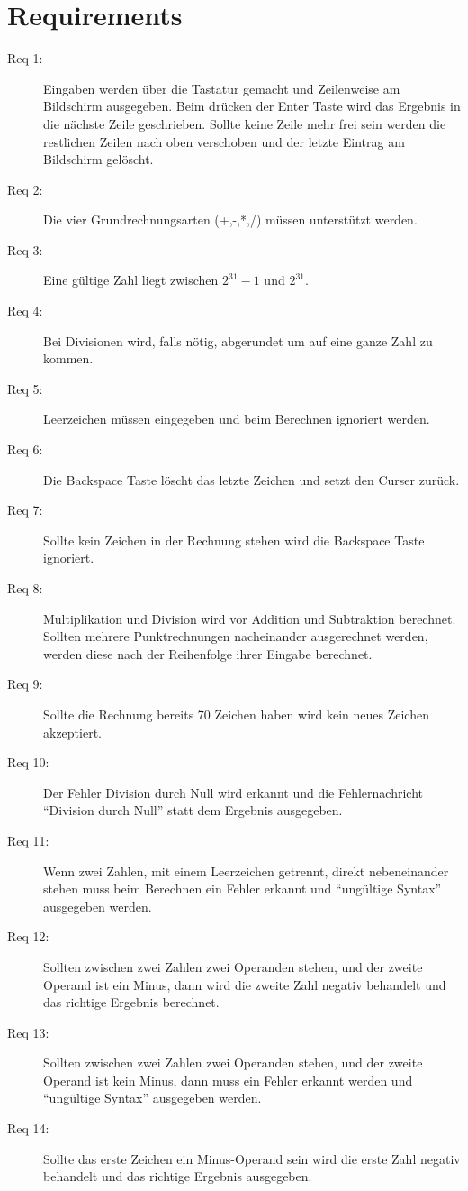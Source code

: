 \section{Requirements}
\label{sec_requirements}
\begin{description}
\item[Req 1:] Eingaben werden über die Tastatur gemacht und Zeilenweise am Bildschirm ausgegeben. Beim drücken der Enter Taste
wird das Ergebnis in die nächste Zeile geschrieben. Sollte keine Zeile mehr frei sein werden die restlichen Zeilen nach 
oben verschoben und der letzte Eintrag am Bildschirm gelöscht.
\item[Req 2:] Die vier Grundrechnungsarten (+,-,*,/) müssen unterstützt werden.
\item[Req 3:] Eine gültige Zahl liegt zwischen $2^31 -1$ und $2^31$.
\item[Req 4:] Bei Divisionen wird, falls nötig, abgerundet um auf eine ganze Zahl zu kommen.
\item[Req 5:] Leerzeichen müssen eingegeben und beim Berechnen ignoriert werden.
\item[Req 6:] Die Backspace Taste löscht das letzte Zeichen und setzt den Curser zurück.
\item[Req 7:] Sollte kein Zeichen in der Rechnung stehen wird die Backspace Taste ignoriert.
\item[Req 8:] Multiplikation und Division wird vor Addition und Subtraktion berechnet. Sollten mehrere Punktrechnungen nacheinander 
ausgerechnet werden, werden diese nach der Reihenfolge ihrer Eingabe berechnet.
\item[Req 9:] Sollte die Rechnung bereits 70 Zeichen haben wird kein neues Zeichen akzeptiert.
\item[Req 10:] Der Fehler Division durch Null wird erkannt und die Fehlernachricht ``Division durch Null'' statt dem Ergebnis ausgegeben.
\item[Req 11:] Wenn zwei Zahlen, mit einem Leerzeichen getrennt, direkt nebeneinander stehen muss beim Berechnen ein Fehler erkannt und
``ungültige Syntax'' ausgegeben werden.
\item[Req 12:] Sollten zwischen zwei Zahlen zwei Operanden stehen, und der zweite Operand ist ein Minus, dann wird die zweite Zahl negativ behandelt 
und das richtige Ergebnis berechnet.
\item[Req 13:] Sollten zwischen zwei Zahlen zwei Operanden stehen, und der zweite Operand ist kein Minus, dann muss ein Fehler erkannt werden
und ``ungültige Syntax'' ausgegeben werden.
\item[Req 14:] Sollte das erste Zeichen ein Minus-Operand sein wird die erste Zahl negativ behandelt und das richtige Ergebnis ausgegeben.

\end{description}
